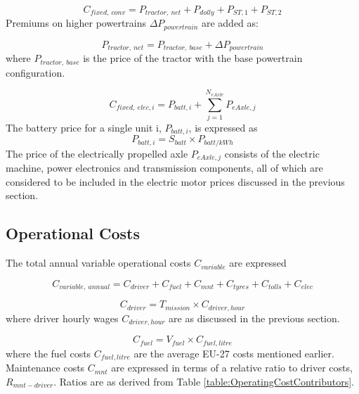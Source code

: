 \documentclass[ExampleMasters.tex]{subfiles}
\begin{document}
			\begin{equation}
				C_{fixed,\ conv} = P_{tractor,\ net}+P_{dolly}+P_{ST,1}+P_{ST,2}
			\end{equation}
			Premiums on higher powertrains $\Delta P_{powertrain}$ are added as:
			
			\begin{equation}
				P_{tractor,\ net} = P_{tractor,\ base} + \Delta P_{powertrain}
			\end{equation}
			where $P_{tractor,\ base}$ is the price of the tractor with the base powertrain configuration. 

			\begin{equation}
				C_{fixed,\ elec, i} = P_{batt,i}+\displaystyle \sum_{j=1}^{N_{eAxle}} P_{eAxle,j}
			\end{equation}
			The battery price for a single unit i, $P_{batt,i}$, is expressed as
			\begin{equation}
				P_{batt,i}= S_{batt} \times P_{batt/kWh}
			\end{equation}
			The price of the electrically propelled axle $P_{eAxle,j}$ consists of the electric machine, power electronics and transmission components, all of which are considered to be included in the electric motor prices discussed in the previous section.

		\subsection{Operational Costs}
			The total annual variable operational costs $C_{variable}$ are expressed
			
			\begin{equation}
				C_{variable,\ annual} = C_{driver} + C_{fuel} + C_{mnt} + C_{tyres} + C_{tolls} + C_{elec}
			\end{equation}

			\begin{equation}
				C_{driver} = T_{mission} \times C_{driver, hour}
			\end{equation}
			where driver hourly wages $C_{driver, hour}$ are as discussed in the previous section.

			\begin{equation}
				C_{fuel} = V_{fuel} \times C_{fuel, litre}
			\end{equation}
			where the fuel costs $C_{fuel, litre}$ are the average EU-27 costs mentioned earlier. Maintenance costs $C_{mnt}$ are expressed in terms of a relative ratio to driver costs, $R_{mnt-driver}$. Ratios are as derived from Table \ref{table:OperatingCostContributors}.
\end{document}
